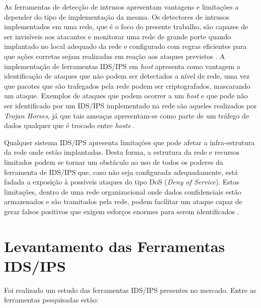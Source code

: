 	As ferramentas de detecção de intrusos apresentam vantagens e limitações a depender do tipo de implementação da mesma. Os detectores de intrusos implementados em uma rede, que é o foco do presente trabalho, são capazes de ser invisíveis aos atacantes e monitorar uma rede de grande porte quando implantado no local adequado da rede e configurado com regras eficientes para que ações corretas sejam realizadas em reação aos ataques previstos \cite{Comunidade_Snort_Brasil}.
	A implementação de ferramentas IDS/IPS em \textit{host} apresenta como vantagem a identificação de ataques que não podem ser detectados a nível de rede, uma vez que pacotes que são trafegados pela rede podem ser criptografados, mascarando um ataque. Exemplos de ataques que podem ocorrer a um \textit{host} e que pode não ser identificado por um IDS/IPS implementado na rede são aqueles realizados por \textit{Trojan Horses}, já que tais ameaças apresentam-se como parte de um tráfego de dados qualquer que é trocado entre \textit{hosts} \cite{Comunidade_Snort_Brasil}.
		
	Qualquer sistema IDS/IPS apresenta limitações que pode afetar a infra-estrutura da rede onde estão implantadas. Desta forma, a estrutura da rede e recursos limitados podem se tornar um obstáculo ao uso de todos os poderes da ferramenta de IDS/IPS que, caso não seja configurada adequadamente, está fadada a exposição à possíveis ataques do tipo DoS (\textit{Deny of Service}). Estas limitações, dentro de uma rede organizacional onde dados confidenciais estão armazenados e são tramitados pela rede, podem facilitar um ataque capaz de gerar falsos positivos que exigem esforços enormes para serem identificados \cite{Morais}.

	\section{Levantamento das Ferramentas IDS/IPS}
	\label{sec:IDS_Ferramentas}
	

		Foi realizado um estudo das ferramentas IDS/IPS presentes no mercado. Entre as ferramentas pesquisadas estão:

